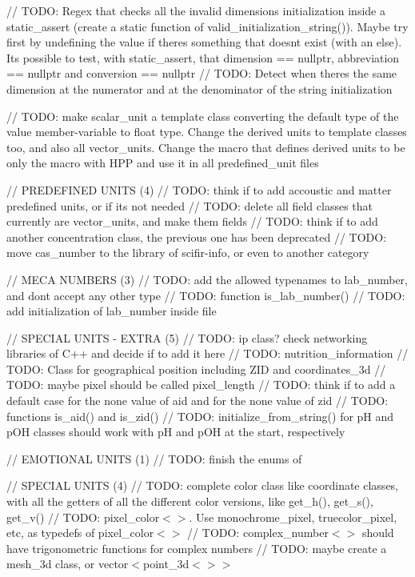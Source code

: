 // TODO\+: Regex that checks all the invalid dimensions initialization inside a static\+\_\+assert (create a static function of valid\+\_\+initialization\+\_\+string()). Maybe try first by undefining the value if there\textquotesingle{}s something that doesn\textquotesingle{}t exist (with an else). It\textquotesingle{}s possible to test, with static\+\_\+assert, that dimension == nullptr, abbreviation == nullptr and conversion == nullptr // TODO\+: Detect when there\textquotesingle{}s the same dimension at the numerator and at the denominator of the string initialization

// TODO\+: make scalar\+\_\+unit a template class converting the default type of the value member-\/variable to float type. Change the derived units to template classes too, and also all vector\+\_\+units. Change the macro that defines derived units to be only the macro with HPP and use it in all predefined\+\_\+unit files

// PREDEFINED UNITS (4) // TODO\+: think if to add accoustic and matter predefined units, or if it\textquotesingle{}s not needed // TODO\+: delete all field classes that currently are vector\+\_\+units, and make them fields // TODO\+: think if to add another concentration class, the previous one has been deprecated // TODO\+: move cas\+\_\+number to the library of scifir-\/info, or even to another category

// MECA NUMBERS (3) // TODO\+: add the allowed typenames to lab\+\_\+number, and don\textquotesingle{}t accept any other type // TODO\+: function is\+\_\+lab\+\_\+number() // TODO\+: add initialization of lab\+\_\+number inside  file

// SPECIAL UNITS -\/ EXTRA (5) // TODO\+: ip class? check networking libraries of C++ and decide if to add it here // TODO\+: nutrition\+\_\+information // TODO\+: Class for geographical position including ZID and coordinates\+\_\+3d // TODO\+: maybe pixel should be called pixel\+\_\+length // TODO\+: think if to add a default case for the none value of aid and for the none value of zid // TODO\+: functions is\+\_\+aid() and is\+\_\+zid() // TODO\+: initialize\+\_\+from\+\_\+string() for pH and p\+OH classes should work with pH and p\+OH at the start, respectively

// EMOTIONAL UNITS (1) // TODO\+: finish the enums of 

// SPECIAL UNITS (4) // TODO\+: complete color class like coordinate classes, with all the getters of all the different color versions, like get\+\_\+h(), get\+\_\+s(), get\+\_\+v() // TODO\+: pixel\+\_\+color$<$$>$. Use monochrome\+\_\+pixel, truecolor\+\_\+pixel, etc, as typedefs of pixel\+\_\+color$<$$>$ // TODO\+: complex\+\_\+number$<$$>$ should have trigonometric functions for complex numbers // TODO\+: maybe create a mesh\+\_\+3d class, or vector$<$point\+\_\+3d$<$$>$$>$


